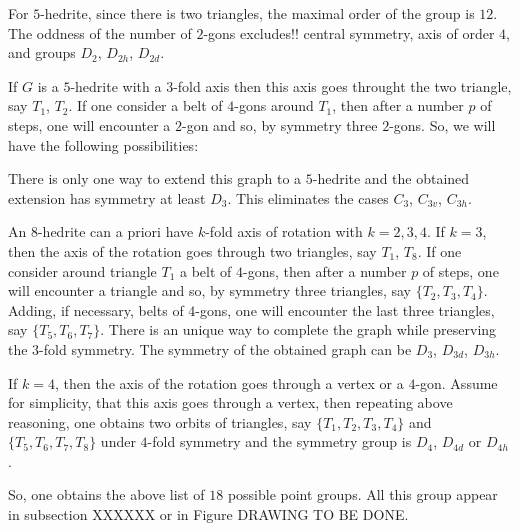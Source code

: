 \documentclass[12pt]{article}
\begin{document}
For $5$-hedrite, since there is two triangles, the maximal order of the group is $12$. The oddness of the number of $2$-gons excludes!! central symmetry, axis of order $4$, and groups $D_2$, $D_{2h}$, $D_{2d}$.

If $G$ is a $5$-hedrite with a $3$-fold axis then this axis goes throught the two triangle, say $T_1$, $T_2$. If one consider a belt of $4$-gons around $T_1$, then after a number $p$ of steps, one will encounter a $2$-gon and so, by symmetry three $2$-gons. So, we will have the following possibilities:

\begin{center}
\epsfxsize=60mm
\end{center}

There is only one way to extend this graph to a $5$-hedrite and the obtained extension has symmetry at least $D_3$. This eliminates the cases $C_3$, $C_{3v}$, $C_{3h}$.

An $8$-hedrite can a priori have $k$-fold axis of rotation with $k=2, 3, 4$. If $k=3$, then the axis of the rotation goes through two triangles, say $T_1$, $T_8$. If one consider around triangle $T_1$ a belt of $4$-gons, then after a number $p$ of steps, one will encounter a triangle and so, by symmetry three triangles, say $\{T_2, T_3, T_4\}$. Adding, if necessary, belts of $4$-gons, one will encounter the last three triangles, say $\{T_5, T_6, T_7\}$. There is an unique way to complete the graph while preserving the $3$-fold symmetry. The symmetry of the obtained graph can be $D_3$, $D_{3d}$, $D_{3h}$. 

If $k=4$, then the axis of the rotation goes through a vertex or a $4$-gon. Assume for simplicity, that this axis goes through a vertex, then repeating above reasoning, one obtains two orbits of triangles, say $\{T_1, T_2, T_3, T_4\}$ and $\{T_5, T_6, T_7, T_8\}$ under $4$-fold symmetry and the symmetry group is $D_4$, $D_{4d}$ or $D_{4h}$.

So, one obtains the above list of $18$ possible point groups. All this group appear in subsection XXXXXX or in Figure DRAWING TO BE DONE.


\begin{center}
\epsfxsize=60mm
\end{center}

\begin{center}
\epsfxsize=60mm
\end{center}
\end{document}
